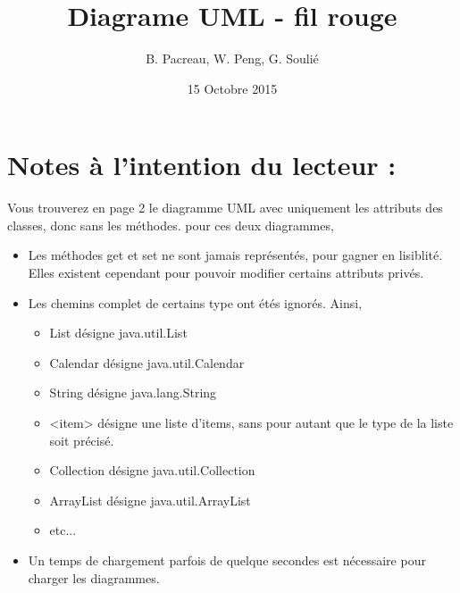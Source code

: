 \documentclass[a4paper,11pt]{article}
\date{15 Octobre 2015}
\title{Diagrame UML - fil rouge}
\author{B. Pacreau, W. Peng, G. Soulié}
\begin{document}
\maketitle
\vskip 60pt
\section*{Notes à l'intention du lecteur :}
Vous trouverez en page 2 le diagramme UML avec uniquement les attributs des classes, donc sans les méthodes. pour ces deux diagrammes,
\begin{itemize}
\item Les méthodes get et set ne sont jamais représentés, pour gagner en lisiblité. Elles existent cependant pour pouvoir modifier certains attributs privés.
\item Les chemins complet de certains type ont étés ignorés. Ainsi, 
\begin{itemize}
\item List désigne java.util.List
\item Calendar désigne java.util.Calendar
\item String désigne java.lang.String
\item <item> désigne une liste d'items, sans pour autant que le type de la liste soit précisé.
\item Collection désigne java.util.Collection
\item ArrayList désigne java.util.ArrayList
\item etc...
\end{itemize}
\item Un temps de chargement parfois de quelque secondes est nécessaire pour charger les diagrammes.
\end{itemize}

\clearpage

\clearpage

\end{document}
